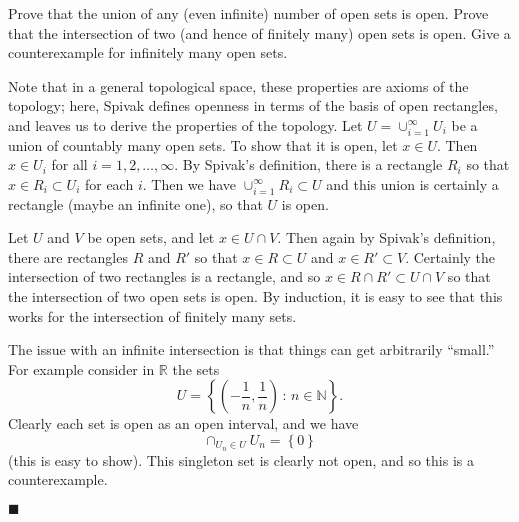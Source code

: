 \documentclass[12pt]{article}
\renewcommand{\qed}{\hfill$\blacksquare$}
\renewenvironment{proof}{\begin{addmargin}[1em]{0em}\begin{newproof}}{\end{newproof}\end{addmargin}\qed}
\newenvironment{problem}[2][Problem]{\begin{trivlist}
\item[\hskip \labelsep {\bfseries #1}\hskip \labelsep {\bfseries #2.}]}{\end{trivlist}}
\begin{document}
\begin{problem}{1-14}
Prove that the union of any (even infinite) number of open sets is open. Prove that the intersection of two (and hence of finitely many) open sets is open. Give a counterexample for infinitely many open sets.
\end{problem}
\begin{proof} 
Note that in a general topological space, these properties are axioms of the topology; here, Spivak defines openness in terms of the basis of open rectangles, and leaves us to derive the properties of the topology. Let $U = \cup_{i=1}^{\infty} U_i$ be a union of countably many open sets. To show that it is open, let $x \in U$. Then $x \in U_i$ for all $i=1,2,\ldots,\infty$. By Spivak's definition, there is a rectangle $R_i$ so that $x \in R_i \subset U_i$ for each $i$. Then we have $\cup_{i=1}^{\infty} R_i \subset U$ and this union is certainly a rectangle (maybe an infinite one), so that $U$ is open.

Let $U$ and $V$ be open sets, and let $x \in U\cap V$. Then again by Spivak's definition, there are rectangles $R$ and $R'$ so that $x \in R \subset U$ and $x \in R' \subset V$. Certainly the intersection of two rectangles is a rectangle, and so $x \in R \cap R' \subset U\cap V$ so that the intersection of two open sets is open. By induction, it is easy to see that this works for the intersection of finitely many sets.

The issue with an infinite intersection is that things can get arbitrarily ``small.'' For example consider in $\mathbb{R}$ the sets $$ U= \left\{ \left(-\frac{1}{n}, \frac{1}{n}\right) \, : \, n\in\mathbb{N} \right\}. $$ Clearly each set is open as an open interval, and we have $$ \cap_{U_n \in U} U_n = \left\{ 0 \right\} $$ (this is easy to show). This singleton set is clearly not open, and so this is a counterexample.
\end{proof}

 
 
\end{document}
